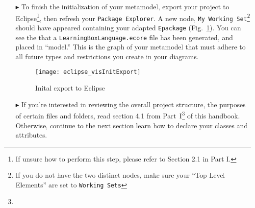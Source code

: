 \begin{itemize}
\newpage

\item[$\blacktriangleright$] To finish the initialization of your metamodel, export your project to Eclipse\footnote{If unsure how to perform this step, please
refer to Section 2.1 in Part I.}, then refresh your \texttt{Package Explorer}. A new node, \texttt{My Working Set}\footnote{If you do not have the two distinct
nodes, make sure your ``Top Level Elements'' are set to \texttt{Working Sets}} should have appeared containing your adapted \texttt{Epackage}
(Fig.~\ref{fig:init_export}). You can see the that a \texttt{LearningBoxLanguage.ecore} file has been generated, and placed in ``model.'' This is the graph of
your metamodel that must adhere to all future types and restrictions you create in your diagrams.

\vspace{0.5cm}

\begin{figure}[htbp]
	\centering
  \texttt{[image: eclipse\_visInitExport]}
	\caption{Inital export to Eclipse}
	\label{fig:init_export}
\end{figure}
\FloatBarrier

\vspace{0.5cm}

\item[$\blacktriangleright$] If you're interested in reviewing the overall project structure, the purposes of certain files and folders, read section 4.1 from
Part~I\footnote{\downLink} of this handbook. Otherwise, continue to the next section learn how to declare your classes and attributes.

\end{itemize}
